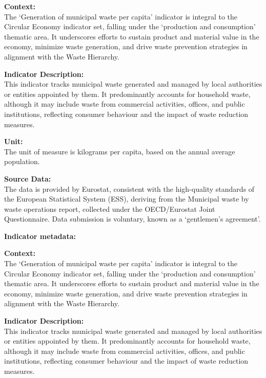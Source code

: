 {\large\textbf{Context:}}  \\ \indent
The `Generation of municipal waste per capita' indicator is integral to the Circular Economy indicator set, falling under the `production and consumption' thematic area. It underscores efforts to sustain product and material value in the economy, minimize waste generation, and drive waste prevention strategies in alignment with the Waste Hierarchy.

{\large\textbf{Indicator Description:}}  \\ \indent
This indicator tracks municipal waste generated and managed by local authorities or entities appointed by them. It predominantly accounts for household waste, although it may include waste from commercial activities, offices, and public institutions, reflecting consumer behaviour and the impact of waste reduction measures.

{\large\textbf{Unit:}}  \\ \indent
The unit of measure is kilograms per capita, based on the annual average population.

{\large\textbf{Source Data:}}  \\ \indent
The data is provided by Eurostat, consistent with the high-quality standards of the European Statistical System (ESS), deriving from the Municipal waste by waste operations report, collected under the OECD/Eurostat Joint Questionnaire. Data submission is voluntary, known as a `gentlemen's agreement'.

\textbf{Indicator metadata:}   \href{https://ec.europa.eu/eurostat/cache/metadata/en/cei_pc032_esmsip2.htm}{\faExternalLink}

{\large\textbf{Context:}}  \\ \indent
The `Generation of municipal waste per capita' indicator is integral to the Circular Economy indicator set, falling under the `production and consumption' thematic area. It underscores efforts to sustain product and material value in the economy, minimize waste generation, and drive waste prevention strategies in alignment with the Waste Hierarchy.

{\large\textbf{Indicator Description:}}  \\ \indent
This indicator tracks municipal waste generated and managed by local authorities or entities appointed by them. It predominantly accounts for household waste, although it may include waste from commercial activities, offices, and public institutions, reflecting consumer behaviour and the impact of waste reduction measures.

